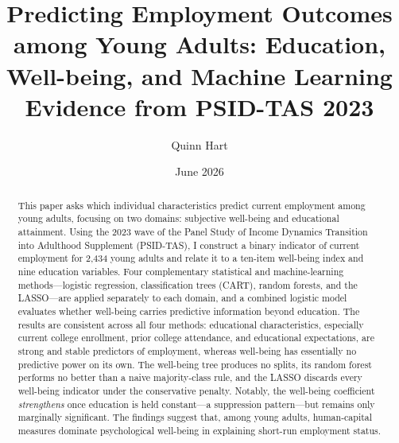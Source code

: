 \documentclass[
  11pt,
]{article}
\title{Predicting Employment Outcomes among Young Adults: Education,
Well-being, and Machine Learning Evidence from PSID-TAS 2023}
\author{Quinn Hart}
\date{June 2026}
\begin{document}
\maketitle

\begin{abstract}
This paper asks which individual characteristics predict current employment among young adults, focusing on two domains: subjective well-being and educational attainment. Using the 2023 wave of the Panel Study of Income Dynamics Transition into Adulthood Supplement (PSID-TAS), I construct a binary indicator of current employment for 2{,}434 young adults and relate it to a ten-item well-being index and nine education variables. Four complementary statistical and machine-learning methods---logistic regression, classification trees (CART), random forests, and the LASSO---are applied separately to each domain, and a combined logistic model evaluates whether well-being carries predictive information beyond education. The results are consistent across all four methods: educational characteristics, especially current college enrollment, prior college attendance, and educational expectations, are strong and stable predictors of employment, whereas well-being has essentially no predictive power on its own. The well-being tree produces no splits, its random forest performs no better than a naive majority-class rule, and the LASSO discards every well-being indicator under the conservative penalty. Notably, the well-being coefficient \emph{strengthens} once education is held constant---a suppression pattern---but remains only marginally significant. The findings suggest that, among young adults, human-capital measures dominate psychological well-being in explaining short-run employment status.
\end{abstract}

\vspace{0.5em}
\end{document}
